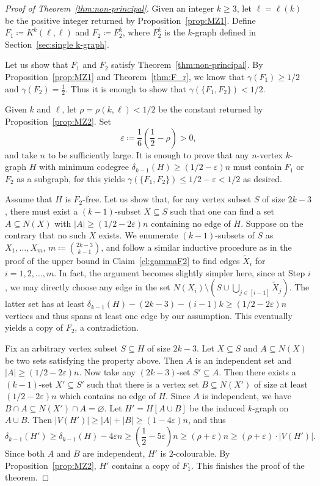\documentclass[11pt,a4paper]{article}
\theoremstyle{remark}
\begin{document}
\begin{proof}[Proof of Theorem~\ref{thm:non-principal}]
    Given an integer $k\ge 3$, let $\ell=\ell(k)$ be the positive integer returned by Proposition~\ref{prop:MZ1}. Define $F_1\coloneqq K^k(\ell,\ell)$ and $F_2 \coloneqq F^k_2$, where  $F^k_2$ is the $k$-graph defined in Section~\ref{sec:single k-graph}.
    
    Let us show that $F_1$ and $F_2$ satisfy Theorem~\ref{thm:non-principal}. By Proposition~\ref{prop:MZ1} and Theorem~\ref{thm:F_r}, we  know that $\gamma(F_1)\ge 1/2$ and $\gamma (F_2) =\frac{1}{2}$. Thus it is enough to show that $\gamma(\{F_1,F_2\})<1/2$.
    
    
Given $k$ and $\ell$, let $\rho =\rho(k,\ell)<1/2$ be the constant returned by Proposition~\ref{prop:MZ2}. Set 
$$\varepsilon\coloneqq \frac{1}{6}\left(\frac{1}{2}-\rho\right)>0,$$
        and take $n$ to be sufficiently large. It is enough to prove that any $n$-vertex $k$-graph $H$ with minimum codegree $\delta_{k-1}(H)\ge (1/2-\varepsilon)n$ must contain $F_1$ or $F_2$ as a subgraph, for this yields $\gamma(\{F_1,F_2\})\le 1/2-\varepsilon<1/2$ as desired.

Assume that $H$ is $F_2$-free. Let us show that, for any vertex subset $S$ of size $2k-3$, there must exist a $(k-1)$-subset $X\subseteq S$ such that one can find a set $A\subseteq N(X)$ with $|A|\ge (1/2-2\varepsilon)n$ containing no edge of $H$. Suppose on the contrary that no such $X$ exists. We enumerate $(k-1)$-subsets of $S$ as $X_1,\dots,X_m$, $m\coloneqq {2k-3\choose k-1}$, and follow a similar inductive procedure as in the proof of the upper bound in Claim~\ref{cl:gammaF2} to find edges $\tilde{X}_i$ for $i=1,2,\dots,m$. In fact, the argument becomes slightly simpler here, since at Step $i$, we may directly choose any edge in the set $N(X_{i})\setminus (S\cup \bigcup_{j\in [i-1]}\tilde{X}_{j})$. The latter set has at least $\delta_{k-1}(H)-(2k-3)-(i-1)k\ge (1/2-2\varepsilon)n$ vertices and thus spans at least one edge by our assumption. This eventually yields a copy of $F_2$, a contradiction.


Fix an arbitrary vertex subset $S\subseteq H$ of size $2k-3$. Let $X\subseteq S$ and $A\subseteq N(X)$ be two sets satisfying the property above. Then $A$ is an independent set and $|A|\ge (1/2-2\varepsilon)n$. Now take any $(2k-3)$-set $S' \subseteq A$. Then there exists a $(k-1)$-set $X' \subseteq S'$ such that
        there is a vertex set $B \subseteq N(X')$ of size at least \(\left(1/2-2\varepsilon\right)n\) which contains no edge of $H$. Since $A$ is independent, we have $B\cap A\subseteq N(X')\cap A=\varnothing$. Let $H'=H[A\cup B]$ be the induced $k$-graph on $A\cup B$. Then $|V(H')|\ge |A|+|B|\ge (1-4\varepsilon)n$, and thus
        \[
        \delta_{k-1}(H')\ge \delta_{k-1}(H)-4\varepsilon n\ge \left(\frac{1}{2}-5\varepsilon\right)n\ge (\rho+\varepsilon)n\ge (\rho+\varepsilon)\cdot |V(H')|.
        \]
        Since both $A$ and $B$ are independent, $H'$ is $2$-colourable. By Proposition~\ref{prop:MZ2}, $H'$ contains a copy of $F_1$. This finishes the proof of the theorem.
\end{proof}




\end{document}

